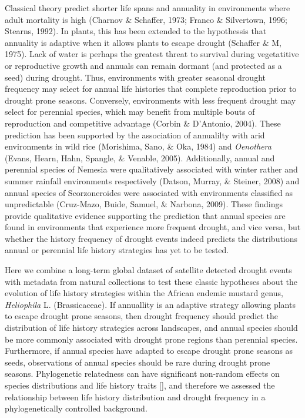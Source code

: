 \documentclass[man,floatsintext]{apa6}
\theoremstyle{definition}
\theoremstyle{definition}
\theoremstyle{definition}
\theoremstyle{remark}
\begin{document}
Classical theory predict shorter life spans and annuality in
environments where adult mortality is high (Charnov \& Schaffer, 1973;
Franco \& Silvertown, 1996; Stearns, 1992). In plants, this has been
extended to the hypothessis that annuality is adaptive when it allows
plants to escape drought (Schaffer \& M, 1975). Lack of water is perhaps
the greatest threat to survival during vegetatitive or reproductive
growth and annuals can remain dormant (and protected as a seed) during
drought. Thus, environments with greater seasonal drought frequency may
select for annual life histories that complete reproduction prior to
drought prone seasons. Conversely, environments with less frequent
drought may select for perennial species, which may benefit from
multiple bouts of reproduction and competitive advantage (Corbin \&
D'Antonio, 2004). These prediction has been supported by the association
of annualilty with arid environments in wild rice (Morishima, Sano, \&
Oka, 1984) and \emph{Oenothera} (Evans, Hearn, Hahn, Spangle, \&
Venable, 2005). Additionally, annual and perennial species of Nemesia
were qualitatively associated with winter rather and summer rainfall
environments respectively (Datson, Murray, \& Steiner, 2008) and annual
species of Scorzoneroides were associated with environments classified
as unpredictable (Cruz-Mazo, Buide, Samuel, \& Narbona, 2009). These
findings provide qualitative evidence supporting the prediction that
annual species are found in environments that experience more frequent
drought, and vice versa, but whether the history frequency of drought
events indeed predicts the distributions annual or perennial life
history strategies has yet to be tested.

Here we combine a long-term global dataset of satellite detected drought
events with metadata from natural collections to test these classic
hypotheses about the evolution of life history strategies within the
African endemic mustard genus, \emph{Heliophila} L. (Brassicaceae). If
annuallity is an adaptive strategy allowing plants to escape drought
prone seasons, then drought frequency should predict the distribution of
life history strategies across landscapes, and annual species should be
more commonly associated with drought prone regions than perennial
species. Furthermore, if annual species have adapted to escape drought
prone seasons as seeds, observations of annual species should be rare
during drought prone seasons. Phylogenetic relatedness can have
significant non-random effects on species distributions and life history
traits {[}{]}, and therefore we assessed the relationship between life
history distribution and drought frequency in a phylogenetically
controlled background.
\end{document}
